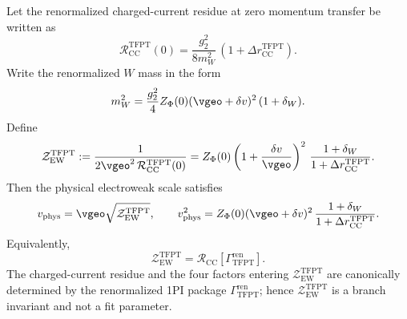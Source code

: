 \begin{theorem}
\label{thm:ew-geometric-to-physical-matching}
Let the renormalized charged-current residue at zero momentum transfer be written as
\[
\mathcal R_{\mathrm{CC}}^{\mathrm{TFPT}}(0)
=
\frac{g_2^2}{8m_W^2}\,(1+\Delta r_{\mathrm{CC}}^{\mathrm{TFPT}}).
\]
Write the renormalized $W$ mass in the form
\[
m_W^2=
\frac{g_2^2}{4}Z_\Phi(0)(\vgeo+\delta v)^2\,(1+\delta_W).
\]
Define
\[
\mathcal Z_{\mathrm{EW}}^{\mathrm{TFPT}}
:=
 \frac{1}{2\vgeo^2\,\mathcal R_{\mathrm{CC}}^{\mathrm{TFPT}}(0)}
 =
Z_\Phi(0)\left(1+\frac{\delta v}{\vgeo}\right)^2
\,\frac{1+\delta_W}{1+\Delta r_{\mathrm{CC}}^{\mathrm{TFPT}}}.
\]
Then the physical electroweak scale satisfies
\[
v_{\mathrm{phys}}
=
\vgeo\sqrt{\mathcal Z_{\mathrm{EW}}^{\mathrm{TFPT}}},
\qquad
v_{\mathrm{phys}}^2
=
Z_\Phi(0)(\vgeo+\delta v)^2\,\frac{1+\delta_W}{1+\Delta r_{\mathrm{CC}}^{\mathrm{TFPT}}}.
\]
Equivalently,
\[
\mathcal Z_{\mathrm{EW}}^{\mathrm{TFPT}}
=
\mathcal R_{\mathrm{CC}}\!\left[\Gamma_{\mathrm{TFPT}}^{\mathrm{ren}}\right].
\]
The charged-current residue and the four factors entering $\mathcal Z_{\mathrm{EW}}^{\mathrm{TFPT}}$
are canonically determined by the renormalized 1PI package $\Gamma_{\mathrm{TFPT}}^{\mathrm{ren}}$;
hence
$\mathcal Z_{\mathrm{EW}}^{\mathrm{TFPT}}$ is a branch invariant and not a fit parameter.
\end{theorem}
